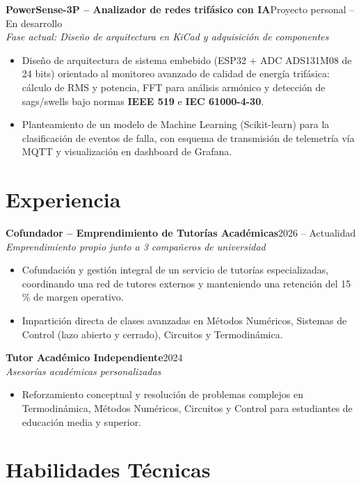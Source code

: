 \documentclass[10pt,a4paper]{article}
\newcommand{\entrada}[3]{%
    \noindent\textbf{\color{primario}#1}\hfill{\small\color{secundario}#2}\\[0pt]
    {\small\itshape\color{secundario}#3}\par\vspace{1pt}%
}
\begin{document}
\entrada{PowerSense-3P -- Analizador de redes trifásico con IA}{Proyecto personal -- En desarrollo}{Fase actual: Diseño de arquitectura en KiCad y adquisición de componentes}
\begin{itemize}
    \item Diseño de arquitectura de sistema embebido (ESP32 + ADC ADS131M08 de 24 bits) orientado al monitoreo avanzado de calidad de energía trifásica: cálculo de RMS y potencia, FFT para análisis armónico y detección de sags/swells bajo normas \textbf{IEEE 519} e \textbf{IEC 61000-4-30}.
    \item Planteamiento de un modelo de Machine Learning (Scikit-learn) para la clasificación de eventos de falla, con esquema de transmisión de telemetría vía MQTT y visualización en dashboard de Grafana.
\end{itemize}
\section*{Experiencia}

\entrada{Cofundador -- Emprendimiento de Tutorías Académicas}{2026 -- Actualidad}{Emprendimiento propio junto a 3 compañeros de universidad}
\begin{itemize}
    \item Cofundación y gestión integral de un servicio de tutorías especializadas, coordinando una red de tutores externos y manteniendo una retención del 15\,\% de margen operativo.
    \item Impartición directa de clases avanzadas en Métodos Numéricos, Sistemas de Control (lazo abierto y cerrado), Circuitos y Termodinámica.
\end{itemize}
\vspace{1pt}

\entrada{Tutor Académico Independiente}{2024}{Asesorías académicas personalizadas}
\begin{itemize}
    \item Reforzamiento conceptual y resolución de problemas complejos en Termodinámica, Métodos Numéricos, Circuitos y Control para estudiantes de educación media y superior.
\end{itemize}

\section*{Habilidades Técnicas}
\end{document}
